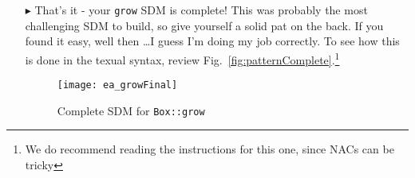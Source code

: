 \begin{itemize}
\vspace{0.5cm}

\item[$\blacktriangleright$]  That's it - your \texttt{grow} SDM is complete! This was probably the most challenging SDM to build, so give yourself a solid 
pat on the back. If you found it easy, well then \ldots I guess I'm doing my job correctly. To see how this is done in the texual syntax, review
Fig.~\ref{fig:patternComplete}.\footnote{We do recommend reading the instructions for this one, since NACs can be tricky}

\vspace{0.5cm}

\begin{figure}[htbp]
\begin{center}
  \texttt{[image: ea\_growFinal]}
  \caption{Complete SDM for \texttt{Box::grow}}  
  \label{fig:growComplete}
\end{center}
\end{figure}
\FloatBarrier


\end{itemize}
